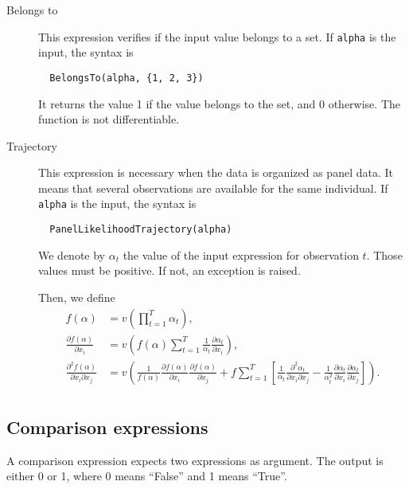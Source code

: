\documentclass[12pt,a4paper]{article}
\begin{document}
\begin{description}
\item[Belongs to] This expression verifies if the input value belongs to a set. 
If \lstinline+alpha+ is the input, the syntax is
\begin{lstlisting}
  BelongsTo(alpha, {1, 2, 3})
\end{lstlisting}
It returns the value 1 if the value belongs to the set, and 0 otherwise. The function is not differentiable.

\item[Trajectory] This expression is necessary when the data is organized as panel data. It means that several observations are available for the same individual.
If \lstinline+alpha+ is the input, the syntax is
\begin{lstlisting}
  PanelLikelihoodTrajectory(alpha)
\end{lstlisting}
We denote by $\alpha_t$ the value of the input expression for observation $t$. Those values must be positive. If not, an exception is raised.

Then, we define
  \begin{align*}
    f(\alpha) &= v\left(\prod_{t=1}^T \alpha_t\right), \\
    \frac{\partial f(\alpha)}{\partial x_i} &= v\left(f(\alpha)\sum_{t=1}^T \frac{1}{\alpha_t} \frac{\partial \alpha_t}{\partial x_i}\right),\\
    \frac{\partial^2 f(\alpha)}{\partial x_i\partial x_j} &= v\left(\frac{1}{f(\alpha)}\frac{\partial f(\alpha)}{\partial x_i}\frac{\partial f(\alpha)}{\partial x_j} + f \sum_{t=1}^T\left[\frac{1}{\alpha_t}\frac{\partial^2 \alpha_t}{\partial x_i \partial x_j } - \frac{1}{\alpha_t^2} \frac{\partial \alpha_t}{\partial x_i}\frac{\partial \alpha_t}{\partial x_j} \right]\right).\\
  \end{align*}

\end{description}
  




\subsection{Comparison expressions}
A comparison expression expects two expressions as argument. The output  is either 0 or 1, where 0 means ``False'' and 1 means ``True''. 
  
\end{document}
